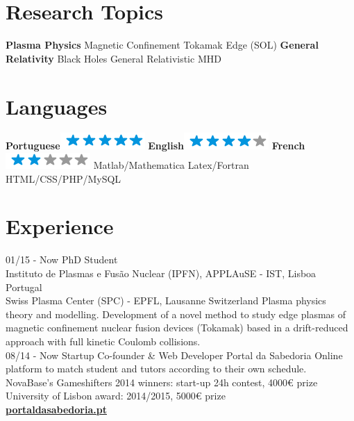\documentclass[]{friggeri-cv}
\begin{document}
\begin{aside}
  \section{Research Topics}
    \textbf{Plasma Physics}
    Magnetic Confinement
    Tokamak Edge (SOL)
    \textbf{General Relativity}
    Black Holes
    General Relativistic MHD
    ~
  \section{Languages}
    \textbf{Portuguese}\includegraphics[scale=0.40]{img/5stars.png}
    \textbf{English}\includegraphics[scale=0.40]{img/4stars.png}
    \textbf{French}\includegraphics[scale=0.40]{img/2stars.png}
    Matlab/Mathematica
    Latex/Fortran
    HTML/CSS/PHP/MySQL
\end{aside}

\section{Experience}
\begin{entrylist}
  \entry
    {01/15 - Now}
    {PhD Student}
    {\\
    Instituto de Plasmas e Fusão Nuclear (IPFN), APPLAuSE - IST, Lisboa Portugal
    \\
    Swiss Plasma Center (SPC) - EPFL, Lausanne Switzerland}
    {Plasma physics theory and modelling. Development of a novel method to study edge plasmas of magnetic confinement nuclear fusion devices (Tokamak) based in a drift-reduced approach with full kinetic Coulomb collisions.\\}
  \entry
    {08/14 - Now}
    {Startup Co-founder \& Web Developer}
    {Portal da Sabedoria}
    {Online platform to match student and tutors according to their own schedule.
    \\
    NovaBase's Gameshifters 2014 winners: start-up 24h contest, 4000€ prize
    \\
    University of Lisbon award: 2014/2015, 5000€ prize
    \\
    \href{http://portaldasabedoria.pt}{\textbf{portaldasabedoria.pt}}\\}
\end{entrylist}
\end{document}
